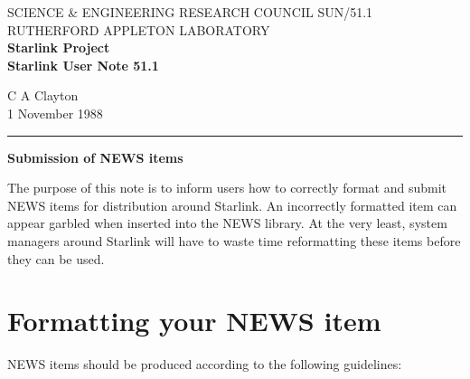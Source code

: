 \pagestyle{myheadings}
\setlength{\textwidth}{160mm}
\setlength{\textheight}{240mm}
\setlength{\topmargin}{-5mm}
\setlength{\oddsidemargin}{0mm}
\setlength{\evensidemargin}{0mm}
\setlength{\parindent}{0mm}
\setlength{\parskip}{\medskipamount}
\setlength{\unitlength}{1mm}


\thispagestyle{empty}
SCIENCE \& ENGINEERING RESEARCH COUNCIL \hfill SUN/51.1\\
RUTHERFORD APPLETON LABORATORY\\
{\large\bf Starlink Project\\}
{\large\bf Starlink User Note 51.1}
\begin{flushright}
C A Clayton\\
1 November 1988
\end{flushright}
\vspace{-4mm}
\rule{\textwidth}{0.5mm}
\vspace{5mm}
\begin{center}
{\Large\bf Submission of NEWS items}
\end{center}
\vspace{5mm}

The purpose of this note is to inform users how to correctly format
and submit NEWS items for distribution around Starlink. An incorrectly
formatted item can appear garbled when inserted into the
NEWS library. At the very least, system managers around Starlink 
will have to waste time reformatting these items before
they can be used. 

\section {Formatting your NEWS item}

NEWS items should be produced according to the following guidelines:

